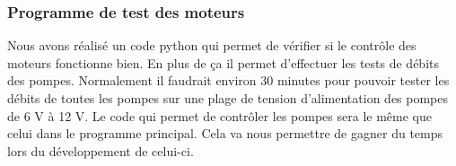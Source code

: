 \documentclass[a4paper, 11pt]{article}
\begin{document}
\subsubsection{Programme de test des moteurs}
Nous avons réalisé un code python qui permet de vérifier si le contrôle des moteurs fonctionne bien.
En plus de ça il permet d'effectuer les tests de débits des pompes.
Normalement il faudrait environ 30 minutes pour pouvoir tester les débits de toutes les pompes sur une plage de tension d'alimentation des pompes de 6 V à 12 V.
Le code qui permet de contrôler les pompes sera le même que celui dans le programme principal.
Cela va nous permettre de gagner du temps lors du développement de celui-ci.
\newpage
%
\printbibliography
\end{document}
